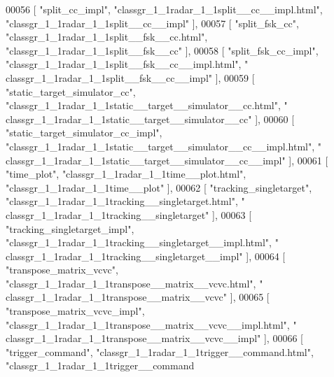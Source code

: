 \begin{DoxyCode}
00056     [ \textcolor{stringliteral}{"split\_cc\_impl"}, \textcolor{stringliteral}{"classgr\_1\_1radar\_1\_1split\_\_cc\_\_impl.html"}, \textcolor{stringliteral}{"classgr\_1\_1radar\_1\_1split\_\_cc\_\_impl"} ],
00057     [ \textcolor{stringliteral}{"split\_fsk\_cc"}, \textcolor{stringliteral}{"classgr\_1\_1radar\_1\_1split\_\_fsk\_\_cc.html"}, \textcolor{stringliteral}{"classgr\_1\_1radar\_1\_1split\_\_fsk\_\_cc"} ],
00058     [ \textcolor{stringliteral}{"split\_fsk\_cc\_impl"}, \textcolor{stringliteral}{"classgr\_1\_1radar\_1\_1split\_\_fsk\_\_cc\_\_impl.html"}, \textcolor{stringliteral}{"
      classgr\_1\_1radar\_1\_1split\_\_fsk\_\_cc\_\_impl"} ],
00059     [ \textcolor{stringliteral}{"static\_target\_simulator\_cc"}, \textcolor{stringliteral}{"classgr\_1\_1radar\_1\_1static\_\_target\_\_simulator\_\_cc.html"}, \textcolor{stringliteral}{"
      classgr\_1\_1radar\_1\_1static\_\_target\_\_simulator\_\_cc"} ],
00060     [ \textcolor{stringliteral}{"static\_target\_simulator\_cc\_impl"}, \textcolor{stringliteral}{"classgr\_1\_1radar\_1\_1static\_\_target\_\_simulator\_\_cc\_\_impl.html"}, \textcolor{stringliteral}{"
      classgr\_1\_1radar\_1\_1static\_\_target\_\_simulator\_\_cc\_\_impl"} ],
00061     [ \textcolor{stringliteral}{"time\_plot"}, \textcolor{stringliteral}{"classgr\_1\_1radar\_1\_1time\_\_plot.html"}, \textcolor{stringliteral}{"classgr\_1\_1radar\_1\_1time\_\_plot"} ],
00062     [ \textcolor{stringliteral}{"tracking\_singletarget"}, \textcolor{stringliteral}{"classgr\_1\_1radar\_1\_1tracking\_\_singletarget.html"}, \textcolor{stringliteral}{"
      classgr\_1\_1radar\_1\_1tracking\_\_singletarget"} ],
00063     [ \textcolor{stringliteral}{"tracking\_singletarget\_impl"}, \textcolor{stringliteral}{"classgr\_1\_1radar\_1\_1tracking\_\_singletarget\_\_impl.html"}, \textcolor{stringliteral}{"
      classgr\_1\_1radar\_1\_1tracking\_\_singletarget\_\_impl"} ],
00064     [ \textcolor{stringliteral}{"transpose\_matrix\_vcvc"}, \textcolor{stringliteral}{"classgr\_1\_1radar\_1\_1transpose\_\_matrix\_\_vcvc.html"}, \textcolor{stringliteral}{"
      classgr\_1\_1radar\_1\_1transpose\_\_matrix\_\_vcvc"} ],
00065     [ \textcolor{stringliteral}{"transpose\_matrix\_vcvc\_impl"}, \textcolor{stringliteral}{"classgr\_1\_1radar\_1\_1transpose\_\_matrix\_\_vcvc\_\_impl.html"}, \textcolor{stringliteral}{"
      classgr\_1\_1radar\_1\_1transpose\_\_matrix\_\_vcvc\_\_impl"} ],
00066     [ \textcolor{stringliteral}{"trigger\_command"}, \textcolor{stringliteral}{"classgr\_1\_1radar\_1\_1trigger\_\_command.html"}, \textcolor{stringliteral}{"classgr\_1\_1radar\_1\_1trigger\_\_command
}
\end{DoxyCode}

